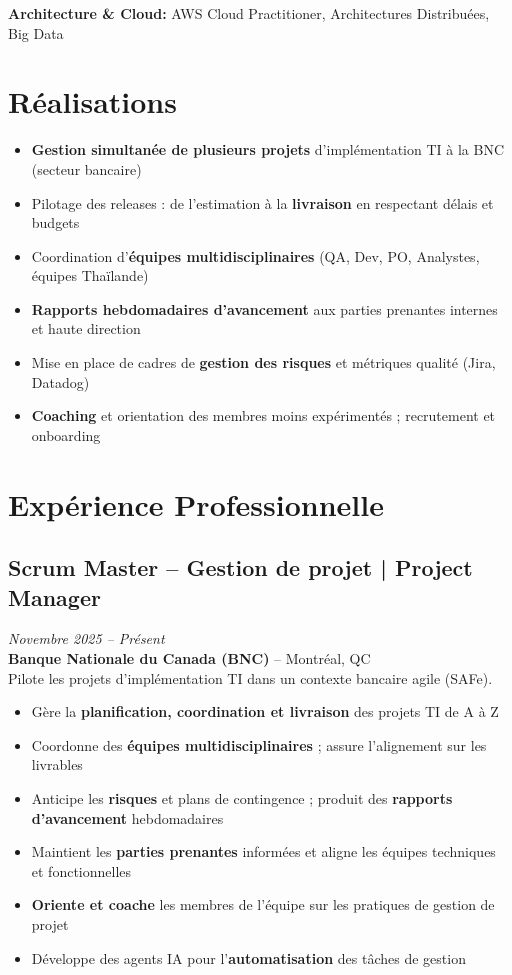 \documentclass[11pt,a4paper]{article}
\begin{document}
\textbf{Architecture \& Cloud:} AWS Cloud Practitioner, Architectures Distribuées, Big Data

\vspace{6pt}

\section*{Réalisations}
\begin{itemize}
    \item \textbf{Gestion simultanée de plusieurs projets} d'implémentation TI à la BNC (secteur bancaire)
    \item Pilotage des releases : de l'estimation à la \textbf{livraison} en respectant délais et budgets
    \item Coordination d'\textbf{équipes multidisciplinaires} (QA, Dev, PO, Analystes, équipes Thaïlande)
    \item \textbf{Rapports hebdomadaires d'avancement} aux parties prenantes internes et haute direction
    \item Mise en place de cadres de \textbf{gestion des risques} et métriques qualité (Jira, Datadog)
    \item \textbf{Coaching} et orientation des membres moins expérimentés ; recrutement et onboarding
\end{itemize}

\section*{Expérience Professionnelle}

\subsection*{Scrum Master -- Gestion de projet | Project Manager} \hfill \textit{Novembre 2025 -- Présent}\\
\textbf{Banque Nationale du Canada (BNC)} -- Montréal, QC\\
Pilote les projets d'implémentation TI dans un contexte bancaire agile (SAFe).
\begin{itemize}
    \item Gère la \textbf{planification, coordination et livraison} des projets TI de A à Z
    \item Coordonne des \textbf{équipes multidisciplinaires} ; assure l'alignement sur les livrables
    \item Anticipe les \textbf{risques} et plans de contingence ; produit des \textbf{rapports d'avancement} hebdomadaires
    \item Maintient les \textbf{parties prenantes} informées et aligne les équipes techniques et fonctionnelles
    \item \textbf{Oriente et coache} les membres de l'équipe sur les pratiques de gestion de projet
    \item Développe des agents IA pour l'\textbf{automatisation} des tâches de gestion
\end{itemize}
\end{document}
